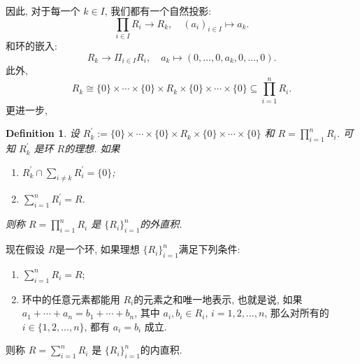 \documentclass[a4paper,12pt]{ctexart}
\newtheorem{definition}{Definition}
\begin{document}
  因此, 对于每一个 $ k \in I $, 我们都有一个自然投影:
  \[\prod_{i \in I} R_i \rightarrow R_k, \quad\left(a_i\right)_{i \in I} \mapsto a_k.\]
  和环的嵌入:
  \[R_k \rightarrow \Pi_{i \in I} R_i, \quad a_k \mapsto\left(0, \ldots, 0, a_k, 0, \ldots, 0\right).\]
  此外, 
  \[R_k \cong\{0\} \times \cdots \times\{0\} \times R_k \times\{0\} \times \cdots \times\{0\} \subseteq \prod_{i=1}^n R_i .\]
  更进一步, 
  \begin{definition}
    设  $ R_k^{\prime}:=\{0\} \times \cdots \times\{0\} \times R_k \times\{0\} \times \cdots \times\{0\} $ 
  和 $ R=\prod_{i=1}^n R_i $. 可知 $ R_k^{\prime} $ 是环 $ R $的理想. 
    如果
    \begin{enumerate}[label=(\roman{*})]
      \item  $ R_k^{\prime} \cap \sum_{i \neq k} R_i^{\prime}=\{0\} $;
      \item $ \sum_{i=1}^n R_i^{\prime}=R$. 
    \end{enumerate}
    则称 $ R=\prod_{i=1}^n R_i $ 是 $ \{R_i\}_{i=1}^n $的外直积.
  \end{definition}
  现在假设 $ R $是一个环, 如果理想 $ \{R_i\}_{i=1}^n $满足下列条件: 
  \begin{enumerate}[label=(\roman{*})]
    \item $ \sum_{i=1}^{n}R_i=R $;
    \item 环中的任意元素都能用 $ R_i $的元素之和唯一地表示, 也就是说, 如果 
    $ a_1+\cdots+a_n = b_1+\cdots+b_n $, 其中 $ a_i,b_i\in R_i $, $ i=1,2,\dots,n $, 那么对所有的 $ i\in\{1,2,...,n\} $, 
    都有 $ a_i=b_i $ 成立.
  \end{enumerate}
  则称 $ R=\sum_{i=1}^{n}R_i $ 是 $ \{R_i\}_{i=1}^n $的内直积.
\end{document}

